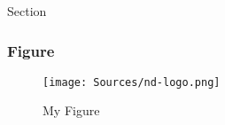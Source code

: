 \documentclass[11pt]{beamer}
\begin{document}
\begin{section}{Section}
\begin{frame}
\frametitle{Figure}
\begin{figure}
\texttt{[image: Sources/nd-logo.png]}
\caption{My Figure}
\end{figure}
\end{frame}
\end{section}
\end{document}
